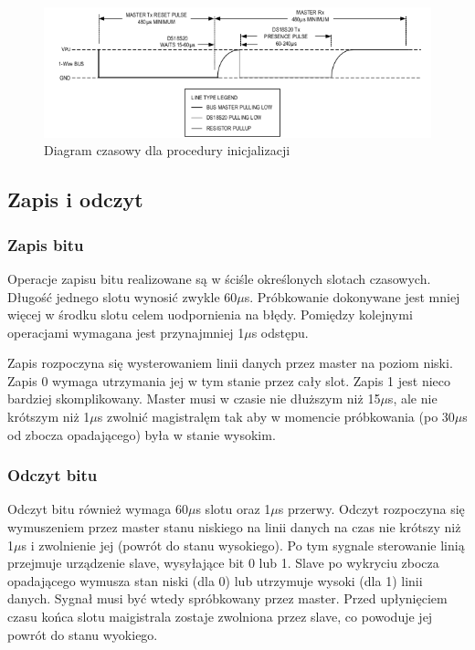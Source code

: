 \documentclass[a4paper]{article}
\begin{document}
\begin{figure}[!h]
\begin{center}
\includegraphics[scale=0.4]{graphics/init.png}
\end{center}
\label{inititming}
\caption{Diagram czasowy dla procedury inicjalizacji}
\end{figure}

\subsection{Zapis i odczyt}
\subsubsection{Zapis bitu}
Operacje zapisu bitu realizowane są w ściśle określonych slotach czasowych. Długość jednego slotu wynosić zwykle 60$\mu$s. Próbkowanie dokonywane jest mniej więcej w środku slotu celem uodpornienia na błędy. Pomiędzy kolejnymi operacjami wymagana jest przynajmniej 1$\mu$s odstępu.

Zapis rozpoczyna się wysterowaniem linii danych przez master na poziom niski. Zapis 0 wymaga utrzymania jej w tym stanie przez cały slot. Zapis 1 jest nieco bardziej skomplikowany. Master musi w czasie nie dłuższym niż 15$\mu$s, ale nie krótszym niż 1$\mu$s zwolnić magistralęm tak aby w momencie próbkowania (po 30$\mu$s od zbocza opadającego) była w stanie wysokim. 

\subsubsection{Odczyt bitu}
Odczyt bitu również wymaga 60$\mu$s slotu oraz 1$\mu$s przerwy. Odczyt rozpoczyna się wymuszeniem przez master stanu niskiego na linii danych na czas nie krótszy niż 1$\mu$s i zwolnienie jej (powrót do stanu wysokiego). Po tym sygnale sterowanie linią przejmuje urządzenie slave, wysyłające bit 0 lub 1. Slave po wykryciu zbocza opadającego wymusza stan niski (dla 0) lub utrzymuje  wysoki (dla 1) linii danych. Sygnał musi być wtedy spróbkowany przez master. Przed upłynięciem czasu końca slotu maigistrala zostaje zwolniona przez slave, co powoduje jej powrót do stanu wyokiego.
\end{document}

